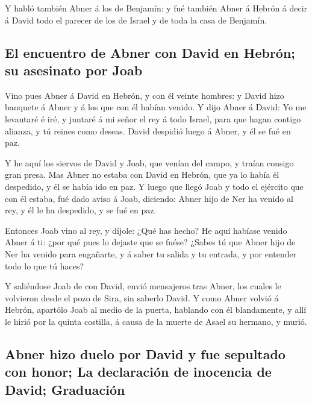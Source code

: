  Y habló también Abner á los de Benjamín: y fué también
Abner á Hebrón á decir á David todo el parecer de los de Israel y de
toda la casa de Benjamín.

\hypertarget{el-encuentro-de-abner-con-david-en-hebruxf3n-su-asesinato-por-joab}{%
\subsection{El encuentro de Abner con David en Hebrón; su asesinato por
Joab}\label{el-encuentro-de-abner-con-david-en-hebruxf3n-su-asesinato-por-joab}}

 Vino pues Abner á David en Hebrón, y con él veinte
hombres: y David hizo banquete á Abner y á los que con él habían venido.
 Y dijo Abner á David: Yo me levantaré é iré, y juntaré á
mi señor el rey á todo Israel, para que hagan contigo alianza, y tú
reines como deseas. David despidió luego á Abner, y él se fué en paz.

 Y he aquí los siervos de David y Joab, que venían del
campo, y traían consigo gran presa. Mas Abner no estaba con David en
Hebrón, que ya lo había él despedido, y él se había ido en paz.
 Y luego que llegó Joab y todo el ejército que con él
estaba, fué dado aviso á Joab, diciendo: Abner hijo de Ner ha venido al
rey, y él le ha despedido, y se fué en paz.

 Entonces Joab vino al rey, y díjole: ¿Qué has hecho? He
aquí habíase venido Abner á ti: ¿por qué pues lo dejaste que se fuése?
 ¿Sabes tú que Abner hijo de Ner ha venido para engañarte,
y á saber tu salida y tu entrada, y por entender todo lo que tú haces?

 Y saliéndose Joab de con David, envió mensajeros tras
Abner, los cuales le volvieron desde el pozo de Sira, sin saberlo David.
 Y como Abner volvió á Hebrón, apartólo Joab al medio de la
puerta, hablando con él blandamente, y allí le hirió por la quinta
costilla, á causa de la muerte de Asael su hermano, y murió.

\hypertarget{abner-hizo-duelo-por-david-y-fue-sepultado-con-honor-la-declaraciuxf3n-de-inocencia-de-david-graduaciuxf3n}{%
\subsection{Abner hizo duelo por David y fue sepultado con honor; La
declaración de inocencia de David;
Graduación}\label{abner-hizo-duelo-por-david-y-fue-sepultado-con-honor-la-declaraciuxf3n-de-inocencia-de-david-graduaciuxf3n}}

